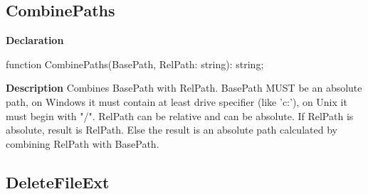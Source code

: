 \documentclass{report}
\newif\ifpdf
\begin{document}
\subsection*{CombinePaths}
\fi
\label{PasDoc_Utils-CombinePaths}
\begin{list}{}{
\setlength{\itemindent}{0cm}
\setlength{\listparindent}{0cm}
\setlength{\leftmargin}{\evensidemargin}
\addtolength{\leftmargin}{\tmplength}
\settowidth{\labelsep}{X}
\addtolength{\leftmargin}{\labelsep}
\setlength{\labelwidth}{\tmplength}
}
\item[\textbf{Declaration}\hfill]
\ifpdf
\begin{flushleft}
\fi
\begin{ttfamily}
function CombinePaths(BasePath, RelPath: string): string;\end{ttfamily}

\ifpdf
\end{flushleft}
\fi

\par
\item[\textbf{Description}]
Combines BasePath with RelPath. BasePath MUST be an absolute path, on Windows it must contain at least drive specifier (like 'c:'), on Unix it must begin with "/". RelPath can be relative and can be absolute. If RelPath is absolute, result is RelPath. Else the result is an absolute path calculated by combining RelPath with BasePath.

\end{list}
\ifpdf
\subsection*{\large{\textbf{DeleteFileExt}}\normalsize\hspace{1ex}\hrulefill}
\else
\end{document}
